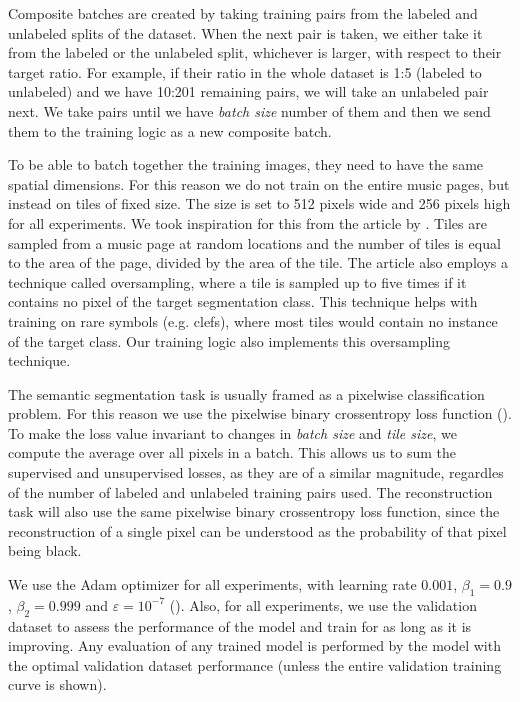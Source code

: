 Composite batches are created by taking training pairs from the labeled and unlabeled splits of the dataset. When the next pair is taken, we either take it from the labeled or the unlabeled split, whichever is larger, with respect to their target ratio. For example, if their ratio in the whole dataset is 1:5 (labeled to unlabeled) and we have 10:201 remaining pairs, we will take an unlabeled pair next. We take pairs until we have \emph{batch size} number of them and then we send them to the training logic as a new composite batch.

To be able to batch together the training images, they need to have the same spatial dimensions. For this reason we do not train on the entire music pages, but instead on tiles of fixed size. The size is set to 512 pixels wide and 256 pixels high for all experiments. We took inspiration for this from the article by \cite{HajicEtAl}. Tiles are sampled from a music page at random locations and the number of tiles is equal to the area of the page, divided by the area of the tile. The article also employs a technique called oversampling, where a tile is sampled up to five times if it contains no pixel of the target segmentation class. This technique helps with training on rare symbols (e.g. clefs), where most tiles would contain no instance of the target class. Our training logic also implements this oversampling technique.

The semantic segmentation task is usually framed as a pixelwise classification problem. For this reason we use the pixelwise binary crossentropy loss function (\cite{DeepLearningBook}). To make the loss value invariant to changes in \emph{batch size} and \emph{tile size}, we compute the average over all pixels in a batch. This allows us to sum the supervised and unsupervised losses, as they are of a similar magnitude, regardles of the number of labeled and unlabeled training pairs used. The reconstruction task will also use the same pixelwise binary crossentropy loss function, since the reconstruction of a single pixel can be understood as the probability of that pixel being black.

We use the Adam optimizer for all experiments, with learning rate $0.001$, $\beta_1 = 0.9$, $\beta_2 = 0.999$ and $\varepsilon = 10^{-7}$ (\cite{AdamOptimizer}). Also, for all experiments, we use the validation dataset to assess the performance of the model and train for as long as it is improving. Any evaluation of any trained model is performed by the model with the optimal validation dataset performance (unless the entire validation training curve is shown).


